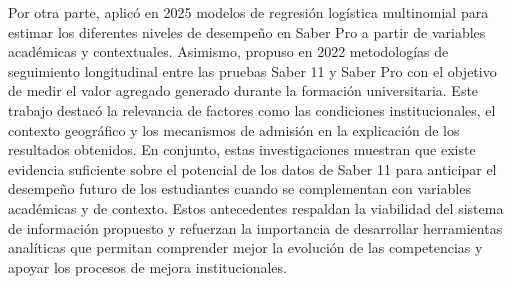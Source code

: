 Por otra parte, \cite{granados2025modelado} aplicó en 2025 modelos de regresión logística multinomial para estimar los diferentes niveles de desempeño en Saber Pro a partir de variables académicas y contextuales. Asimismo, \cite{del2022indice} propuso en 2022 metodologías de seguimiento longitudinal entre las pruebas Saber 11 y Saber Pro con el objetivo de medir el valor agregado generado durante la formación universitaria. Este trabajo destacó la relevancia de factores como las condiciones institucionales, el contexto geográfico y los mecanismos de admisión en la explicación de los resultados obtenidos. En conjunto, estas investigaciones muestran que existe evidencia suficiente sobre el potencial de los datos de Saber 11 para anticipar el desempeño futuro de los estudiantes cuando se complementan con variables académicas y de contexto. Estos antecedentes respaldan la viabilidad del sistema de información propuesto y refuerzan la importancia de desarrollar herramientas analíticas que permitan comprender mejor la evolución de las competencias y apoyar los procesos de mejora institucionales.

